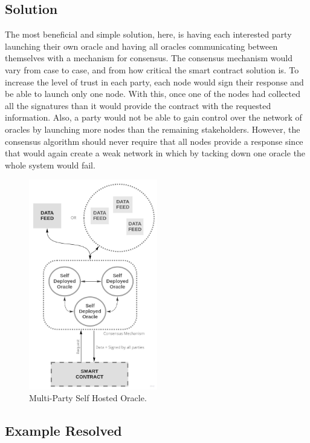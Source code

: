 \subsection{Solution}
The most beneficial and simple solution, here, is having each interested party launching their own oracle and having all oracles communicating between themselves with a mechanism for consensus. The consensus mechanism would vary from case to case, and from how critical the smart contract solution is.
To increase the level of trust in each party, each node would sign their response and be able to launch only one node. With this, once one of the nodes had collected all the signatures than it would provide the contract with the requested information. Also, a party would not be able to gain control over the network of oracles by launching more nodes than the remaining stakeholders.
However, the consensus algorithm should never require that all nodes provide a response since that would again create a weak network in which by tacking down one oracle the whole system would fail.


\begin{figure}[t]
  \begin{center}
    \leavevmode
    \includegraphics[width=0.5\textwidth]{figures/oraclearch4.jpg}
    \caption{Multi-Party Self Hosted Oracle.}
    \label{fig:/figures/paper-screening}
  \end{center}
\end{figure}

\subsection{Example Resolved}

